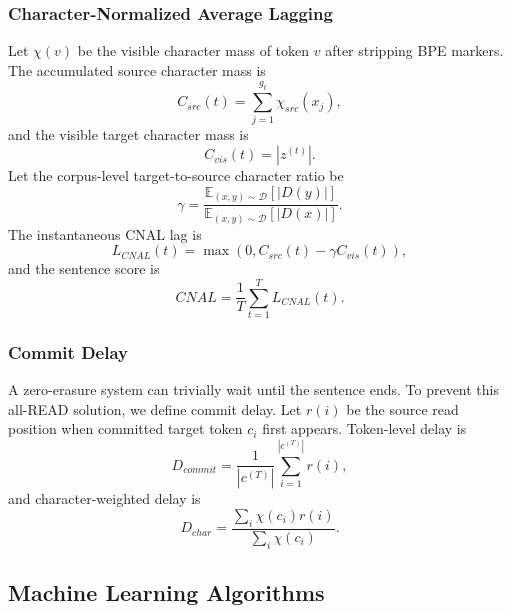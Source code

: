 \documentclass[conference]{IEEEtran}
\begin{document}
\subsubsection{Character-Normalized Average Lagging}
Let $\chi(v)$ be the visible character mass of token $v$ after stripping BPE markers. The accumulated source character mass is
\begin{equation}
    C_{src}(t)=\sum_{j=1}^{g_t}\chi_{src}(x_j),
\end{equation}
and the visible target character mass is
\begin{equation}
    C_{vis}(t)=|z^{(t)}|.
\end{equation}
Let the corpus-level target-to-source character ratio be
\begin{equation}
    \gamma=\frac{\mathbb{E}_{(x,y)\sim \mathcal{D}}[|D(y)|]}{\mathbb{E}_{(x,y)\sim \mathcal{D}}[|D(x)|]}.
\end{equation}
The instantaneous CNAL lag is
\begin{equation}
    L_{CNAL}(t)=\max\left(0, C_{src}(t)-\gamma C_{vis}(t)\right),
\end{equation}
and the sentence score is
\begin{equation}
    CNAL=\frac{1}{T}\sum_{t=1}^{T} L_{CNAL}(t).
\end{equation}

\subsubsection{Commit Delay}
A zero-erasure system can trivially wait until the sentence ends. To prevent this all-READ solution, we define commit delay. Let $r(i)$ be the source read position when committed target token $c_i$ first appears. Token-level delay is
\begin{equation}
    D_{commit}=\frac{1}{|c^{(T)}|}\sum_{i=1}^{|c^{(T)}|} r(i),
\end{equation}
and character-weighted delay is
\begin{equation}
    D_{char}=\frac{\sum_i \chi(c_i)r(i)}{\sum_i \chi(c_i)}.
\end{equation}

\subsection{Machine Learning Algorithms}
\end{document}
